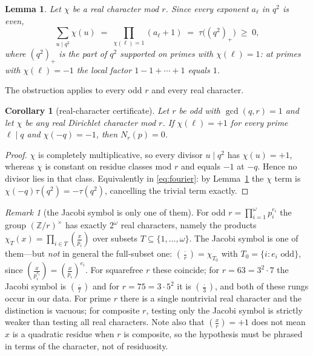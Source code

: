 \documentclass[11pt]{article}
\newtheorem{lemma}[theorem]{Lemma}
\newtheorem{corollary}[theorem]{Corollary}
\theoremstyle{definition}
\theoremstyle{remark}
\newtheorem{remark}[theorem]{Remark}
\newcommand{\jac}[2]{\left(\tfrac{#1}{#2}\right)}
\begin{document}
\begin{lemma}\label{lem:interference}
Let $\chi$ be a real character mod $r$. Since every exponent $a_\ell$ in $q^2$ is even,
\[
\sum_{u \mid q^2} \chi(u) \;=\; \prod_{\chi(\ell) = 1}(a_\ell + 1) \;=\; \tau\bigl((q^2)_+\bigr) \;\ge\; 0,
\]
where $(q^2)_+$ is the part of $q^2$ supported on primes with $\chi(\ell) = 1$: at
primes with $\chi(\ell) = -1$ the local factor $1 - 1 + \cdots + 1$ equals $1$.
\end{lemma}

The obstruction applies to every odd $r$ and every real character.

\begin{corollary}[real-character certificate]\label{cor:blocking}
Let $r$ be odd with $\gcd(q,r) = 1$ and let $\chi$ be any real Dirichlet character
mod $r$. If $\chi(\ell) = +1$ for every prime $\ell \mid q$ and $\chi(-q) = -1$, then
$N_r(p) = 0$.
\end{corollary}

\begin{proof}
$\chi$ is completely multiplicative, so every divisor $u \mid q^2$ has $\chi(u) = +1$,
whereas $\chi$ is constant on residue classes mod $r$ and equals $-1$ at $-q$. Hence no
divisor lies in that class. Equivalently in \eqref{eq:fourier}: by
Lemma~\ref{lem:interference} the $\chi$ term is $\chi(-q)\tau(q^2) = -\tau(q^2)$,
cancelling the trivial term exactly.
\end{proof}

\begin{remark}[the Jacobi symbol is only one of them]\label{rem:whichchi}
For odd $r = \prod_{i=1}^{\omega} p_i^{e_i}$ the group $(\mathbb{Z}/r)^\times$ has
exactly $2^{\omega}$ real characters, namely the products
$\chi_T(x) = \prod_{i \in T} \jac{x}{p_i}$ over subsets
$T \subseteq \{1,\dots,\omega\}$. The Jacobi symbol is one of them---but \emph{not}
in general the full-subset one: $\jac{\cdot}{r} = \chi_{T_0}$ with
$T_0 = \{i : e_i \text{ odd}\}$, since $\jac{x}{p_i^{e_i}} = \jac{x}{p_i}^{e_i}$. For
squarefree $r$ these coincide; for $r = 63 = 3^2\cdot 7$ the Jacobi symbol is
$\jac{\cdot}{7}$ and for $r = 75 = 3\cdot 5^2$ it is $\jac{\cdot}{3}$, and both of
these rungs occur in our data. For prime $r$ there is a single nontrivial real
character and the distinction is vacuous; for composite $r$, testing only the Jacobi
symbol is strictly weaker than testing all real characters. Note also that
$\jac{x}{r} = +1$ does not mean $x$ is a quadratic residue when $r$ is composite, so
the hypothesis must be phrased in terms of the character, not of residuosity.
\end{remark}
\end{document}
